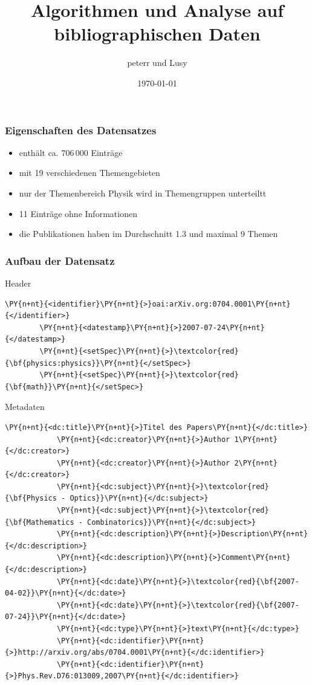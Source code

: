 \documentclass[12pt, xcolor=table]{beamer}
\begin{document}
\title{Algorithmen und Analyse auf bibliographischen Daten}   
\author{peterr und Lusy} 
\date{\today} 

\begin{frame}
	\titlepage
\end{frame}

\begin{frame}
	\frametitle{Eigenschaften des Datensatzes}
	\begin{itemize}
		\item  enthält ca. $706\,000$ Einträge 
		\item  mit 19 verschiedenen Themengebieten 
		\item  nur der Themenbereich Physik wird in Themengruppen unterteiltt
		\item  11 Einträge ohne Informationen
		\item  die Publikationen haben im Durchschnitt 1.3 und maximal 9 Themen
	\end{itemize} 
\end{frame}
\begin{frame}[fragile]
	\frametitle{Aufbau der Datensatz}
	\begin{block}{Header}
	\begin{Verbatim}[commandchars=\\\{\}, fontsize=\tiny, frame=single]
		\PY{n+nt}{<identifier}\PY{n+nt}{>}oai:arXiv.org:0704.0001\PY{n+nt}{</identifier>}
		\PY{n+nt}{<datestamp}\PY{n+nt}{>}2007-07-24\PY{n+nt}{</datestamp>}
		\PY{n+nt}{<setSpec}\PY{n+nt}{>}\textcolor{red}{\bf{physics:physics}}\PY{n+nt}{</setSpec>}
		\PY{n+nt}{<setSpec}\PY{n+nt}{>}\textcolor{red}{\bf{math}}\PY{n+nt}{</setSpec>}
	\end{Verbatim}
	\end{block}
	\begin{block}{Metadaten}
		\begin{Verbatim}[commandchars=\\\{\}, fontsize=\tiny, frame=single]
			\PY{n+nt}{<dc:title}\PY{n+nt}{>}Titel des Papers\PY{n+nt}{</dc:title>}
			\PY{n+nt}{<dc:creator}\PY{n+nt}{>}Author 1\PY{n+nt}{</dc:creator>}
			\PY{n+nt}{<dc:creator}\PY{n+nt}{>}Author 2\PY{n+nt}{</dc:creator>}
			\PY{n+nt}{<dc:subject}\PY{n+nt}{>}\textcolor{red}{\bf{Physics - Optics}}\PY{n+nt}{</dc:subject>}
			\PY{n+nt}{<dc:subject}\PY{n+nt}{>}\textcolor{red}{\bf{Mathematics - Combinatorics}}\PY{n+nt}{</dc:subject>}
			\PY{n+nt}{<dc:description}\PY{n+nt}{>}Description\PY{n+nt}{</dc:description>}
			\PY{n+nt}{<dc:description}\PY{n+nt}{>}Comment\PY{n+nt}{</dc:description>}
			\PY{n+nt}{<dc:date}\PY{n+nt}{>}\textcolor{red}{\bf{2007-04-02}}\PY{n+nt}{</dc:date>}
			\PY{n+nt}{<dc:date}\PY{n+nt}{>}\textcolor{red}{\bf{2007-07-24}}\PY{n+nt}{</dc:date>}
			\PY{n+nt}{<dc:type}\PY{n+nt}{>}text\PY{n+nt}{</dc:type>}
			\PY{n+nt}{<dc:identifier}\PY{n+nt}{>}http://arxiv.org/abs/0704.0001\PY{n+nt}{</dc:identifier>}
			\PY{n+nt}{<dc:identifier}\PY{n+nt}{>}Phys.Rev.D76:013009,2007\PY{n+nt}{</dc:identifier>}
		\end{Verbatim}
	\end{block}
\end{frame}
\end{document}
